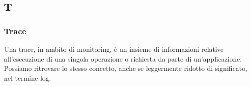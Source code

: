 \subsection*{T}

	\subsubsection*{Trace}

        Una trace, in ambito di monitoring, è un insieme di informazioni relative all'esecuzione di una singola operazione
        o richiesta da parte di un'applicazione.
        Possiamo ritrovare lo stesso concetto, anche se leggermente ridotto di significato, nel termine log.